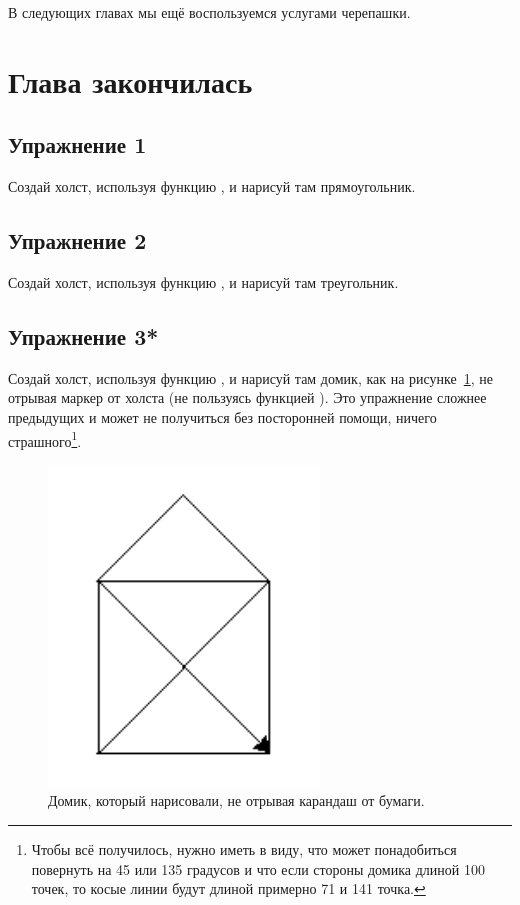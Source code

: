 В следующих главах мы ещё воспользуемся услугами черепашки.

\section{Глава закончилась}


\subsection*{Упражнение 1}
Создай холст, используя функцию , и нарисуй там прямоугольник.

\subsection*{Упражнение 2}
Создай холст, используя функцию , и нарисуй там треугольник.

\subsection*{Упражнение 3*}
Создай холст, используя функцию , и нарисуй там домик, как на рисунке \ref{fighouse}, не отрывая маркер от холста (не пользуясь функцией ). Это упражнение сложнее предыдущих и может не получиться без посторонней помощи, ничего страшного\footnote{Чтобы всё получилось, нужно иметь в виду, что может понадобиться повернуть на 45 или 135 градусов и что если стороны домика длиной 100 точек, то косые линии будут длиной примерно 71 и 141 точка.}.

\begin{figure}
\begin{center}
\includegraphics[width=72mm]{03.house.png}
\end{center}
\caption{Домик, который нарисовали, не отрывая карандаш от бумаги.}\label{fighouse}
\end{figure}

\newpage
